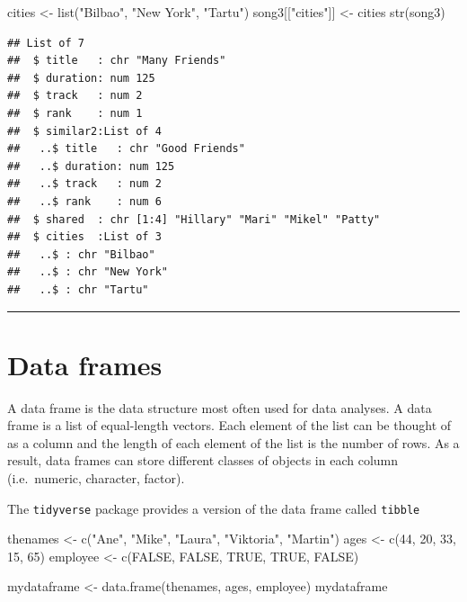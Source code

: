 \documentclass[
]{book}
\newenvironment{Shaded}{\begin{snugshade}}{\end{snugshade}}
\newcommand{\ConstantTok}[1]{\textcolor[rgb]{0.00,0.00,0.00}{#1}}
\newcommand{\DecValTok}[1]{\textcolor[rgb]{0.00,0.00,0.81}{#1}}
\newcommand{\FunctionTok}[1]{\textcolor[rgb]{0.00,0.00,0.00}{#1}}
\newcommand{\NormalTok}[1]{#1}
\newcommand{\OtherTok}[1]{\textcolor[rgb]{0.56,0.35,0.01}{#1}}
\newcommand{\StringTok}[1]{\textcolor[rgb]{0.31,0.60,0.02}{#1}}
\begin{document}
\begin{Shaded}
\begin{Highlighting}[]
\NormalTok{cities }\OtherTok{\textless{}{-}} \FunctionTok{list}\NormalTok{(}\StringTok{"Bilbao"}\NormalTok{, }\StringTok{"New York"}\NormalTok{, }\StringTok{"Tartu"}\NormalTok{)}
\NormalTok{song3[[}\StringTok{"cities"}\NormalTok{]] }\OtherTok{\textless{}{-}}\NormalTok{ cities}
\FunctionTok{str}\NormalTok{(song3)}
\end{Highlighting}
\end{Shaded}

\begin{verbatim}
## List of 7
##  $ title   : chr "Many Friends"
##  $ duration: num 125
##  $ track   : num 2
##  $ rank    : num 1
##  $ similar2:List of 4
##   ..$ title   : chr "Good Friends"
##   ..$ duration: num 125
##   ..$ track   : num 2
##   ..$ rank    : num 6
##  $ shared  : chr [1:4] "Hillary" "Mari" "Mikel" "Patty"
##  $ cities  :List of 3
##   ..$ : chr "Bilbao"
##   ..$ : chr "New York"
##   ..$ : chr "Tartu"
\end{verbatim}

\begin{center}\rule{0.5\linewidth}{0.5pt}\end{center}

\hypertarget{data-frames}{%
\section{Data frames}\label{data-frames}}

A data frame is the data structure most often used for data analyses. A data frame is a list of equal-length vectors. Each element of the list can be thought of as a column and the length of each element of the list is the number of rows. As a result, data frames can store different classes of objects in each column (i.e.~numeric, character, factor).

The \texttt{tidyverse} package provides a version of the data frame called \texttt{tibble}

\begin{Shaded}
\begin{Highlighting}[]
\NormalTok{thenames }\OtherTok{\textless{}{-}} \FunctionTok{c}\NormalTok{(}\StringTok{"Ane"}\NormalTok{, }\StringTok{"Mike"}\NormalTok{, }\StringTok{"Laura"}\NormalTok{, }\StringTok{"Viktoria"}\NormalTok{, }\StringTok{"Martin"}\NormalTok{)}
\NormalTok{ages }\OtherTok{\textless{}{-}} \FunctionTok{c}\NormalTok{(}\DecValTok{44}\NormalTok{, }\DecValTok{20}\NormalTok{, }\DecValTok{33}\NormalTok{, }\DecValTok{15}\NormalTok{, }\DecValTok{65}\NormalTok{)}
\NormalTok{employee }\OtherTok{\textless{}{-}} \FunctionTok{c}\NormalTok{(}\ConstantTok{FALSE}\NormalTok{, }\ConstantTok{FALSE}\NormalTok{, }\ConstantTok{TRUE}\NormalTok{, }\ConstantTok{TRUE}\NormalTok{, }\ConstantTok{FALSE}\NormalTok{)}

\NormalTok{mydataframe }\OtherTok{\textless{}{-}} \FunctionTok{data.frame}\NormalTok{(thenames, ages, employee)}
\NormalTok{mydataframe}
\end{Highlighting}
\end{Shaded}
\end{document}
